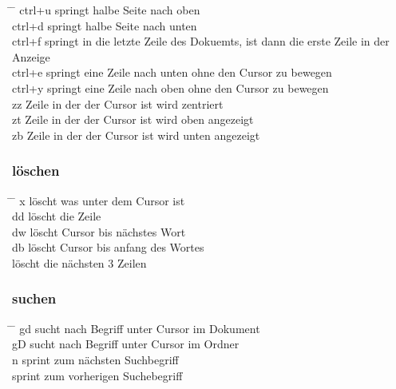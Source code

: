 \documentclass[10pt,a4paper,oneside]{report}
\begin{document}
\begin{tabbing}
  \hspace*{1mm} \=\hspace{30mm} \= \kill
  \> ctrl+u \> springt halbe Seite nach oben\\
  \> ctrl+d \> springt halbe Seite nach unten\\
  \> ctrl+f \> springt in die letzte Zeile des Dokuemts, ist dann die erste Zeile in der Anzeige\\
  \> ctrl+e \> springt eine Zeile nach unten ohne den Cursor zu bewegen\\
  \> ctrl+y \> springt eine Zeile nach oben ohne den Cursor zu bewegen\\
  \> zz \> Zeile in der der Cursor ist wird zentriert\\
  \> zt \> Zeile in der der Cursor ist wird oben angezeigt\\
  \> zb \> Zeile in der der Cursor ist wird unten angezeigt\\
 \end{tabbing}


\subsubsection{löschen}

\begin{tabbing}
  \hspace*{1mm} \=\hspace{30mm} \= \kill
  \> x \> löscht was unter dem Cursor ist\\
  \> dd \> löscht die Zeile\\
  \> dw \> löscht Cursor bis nächstes Wort\\
  \> db \> löscht Cursor bis anfang des Wortes\\
  \> 3dd \> löscht die nächsten 3 Zeilen\\
 \end{tabbing}


 \subsubsection{suchen}

\begin{tabbing}
 \hspace*{1mm} \=\hspace{30mm} \= \kill
 \> gd \> sucht nach Begriff unter Cursor im Dokument\\
 \> gD \> sucht nach Begriff unter Cursor im Ordner\\
 \> n \> sprint zum nächsten Suchbegriff\\
 \>   \> sprint zum vorherigen Suchebegriff\\
\end{tabbing}
\end{document}
